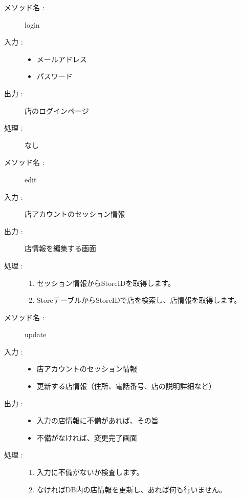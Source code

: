 \documentclass[a4j,titlepage]{jarticle}
\begin{document}
\begin{description}
  \item [メソッド名 :] login
  \item [入力 :]\mbox{}
  \begin{itemize}
    \item メールアドレス
    \item パスワード
  \end{itemize}
  \item [出力 :] 店のログインページ
  \item [処理 :] なし
\end{description}

\begin{description}
  \item [メソッド名 :] edit
  \item [入力 :] 店アカウントのセッション情報
  \item [出力 :] 店情報を編集する画面
  \item [処理 :]\mbox{}
  \begin{enumerate}
    \item セッション情報からStoreIDを取得します。
    \item StoreテーブルからStoreIDで店を検索し、店情報を取得します。
  \end{enumerate}
\end{description}

\begin{description}
  \item [メソッド名 :] update
  \item [入力 :]\mbox{}
  \begin{itemize}
    \item 店アカウントのセッション情報
    \item 更新する店情報（住所、電話番号、店の説明詳細など）
  \end{itemize}
  \item [出力 :]\mbox{}
  \begin{itemize}
    \item 入力の店情報に不備があれば、その旨
    \item 不備がなければ、変更完了画面
  \end{itemize}
  \item [処理 :]\mbox{}
  \begin{enumerate}
    \item 入力に不備がないか検査します。
    \item なければDB内の店情報を更新し、あれば何も行いません。
  \end{enumerate}
\end{description}
\end{document}
